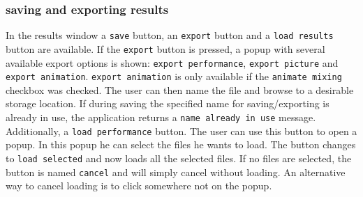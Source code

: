 \subsubsection{saving and exporting results}
In the results window a \texttt{save} button, an \texttt{export} button and a \texttt{load results} button are available. If the \texttt{export} button is pressed, a popup with several available export options is shown: \texttt{export performance}, \texttt{export picture} and \texttt{export animation}. \texttt{export animation} is only available if the \texttt{animate mixing} checkbox was checked. The user can then name the file and browse to a desirable storage location. If during saving the specified name for saving/exporting is already in use, the application returns a \texttt{name already in use} message. Additionally, a \texttt{load performance} button. The user can use this button to open a popup. In this popup he can select the files he wants to load. The button changes to \texttt{load selected} and now loads all the selected files. If no files are selected, the button is named \texttt{cancel} and will simply cancel without loading. An alternative way to cancel loading is to click somewhere not on the popup.









